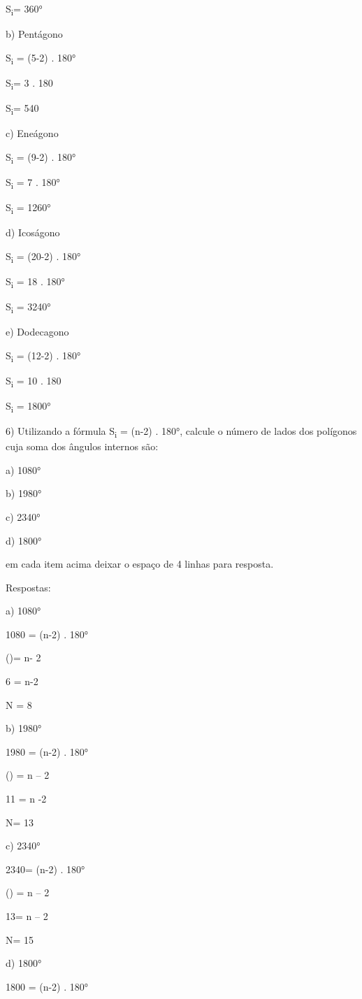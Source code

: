 S\textsubscript{i}= 360°

b) Pentágono

S\textsubscript{i} = (5-2) . 180°

S\textsubscript{i}= 3 . 180

S\textsubscript{i}= 540

c) Eneágono

S\textsubscript{i} = (9-2) . 180°

S\textsubscript{i} = 7 . 180°

S\textsubscript{i} = 1260°

d) Icoságono

S\textsubscript{i} = (20-2) . 180°

S\textsubscript{i} = 18 . 180°

S\textsubscript{i} = 3240°

e) Dodecagono

S\textsubscript{i} = (12-2) . 180°

S\textsubscript{i} = 10 . 180

S\textsubscript{i} = 1800°

6) Utilizando a fórmula S\textsubscript{i} = (n-2) . 180°, calcule o
número de lados dos polígonos cuja soma dos ângulos internos são:

a) 1080°

b) 1980°

c) 2340°

d) 1800°

em cada item acima deixar o espaço de 4 linhas para resposta.

Respostas:

a) 1080°

1080 = (n-2) . 180°

()= n- 2

6 = n-2

N = 8

b) 1980°

1980 = (n-2) . 180°

() = n -- 2

11 = n -2

N= 13

c) 2340°

2340= (n-2) . 180°

() = n -- 2

13= n -- 2

N= 15

d) 1800°

1800 = (n-2) . 180°

